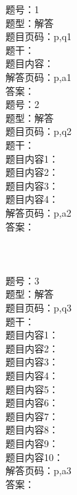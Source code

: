 \documentclass[11pt]{article}
\theoremstyle{definition}
\begin{document}
\begin{CJK*}{UTF8}{gbsn}
题号：1\\
题型：解答\\
题目页码：p,q1\\
题干：\\
题目内容：\\
解答页码：p,a1\\
答案：\\

题号：2\\
题型：解答\\
题目页码：p,q2\\
题干：\\
题目内容1：\\
题目内容2：\\
题目内容3：\\
题目内容4：\\
解答页码：p,a2\\
答案：\\
\\
\\
\\

题号：3\\
题型：解答\\
题目页码：p,q3\\
题干：\\
题目内容1：\\
题目内容2：\\
题目内容3：\\
题目内容4：\\
题目内容5：\\
题目内容6：\\
题目内容7：\\
题目内容8：\\
题目内容9：\\
题目内容10：\\
解答页码：p,a3\\
答案：\\
\\
\\
\\
\\
\\
\\
\\
\\
\\


\end{CJK*}
\end{document}
